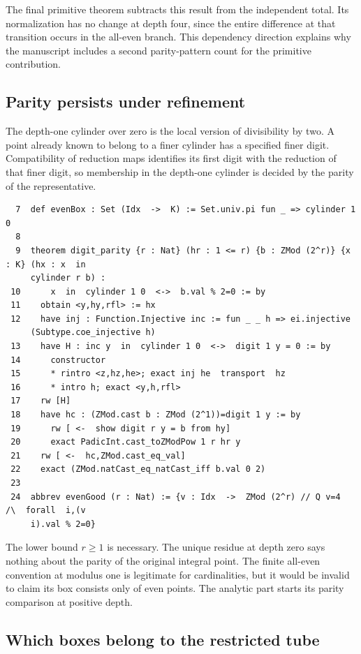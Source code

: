 \documentclass[12pt,letterpaper]{article}
\begin{document}
The final primitive theorem subtracts this result from the independent total. Its normalization has no change at depth four, since the entire difference at that transition occurs in the all-even branch. This dependency direction explains why the manuscript includes a second parity-pattern count for the primitive contribution.
\clearpage{}\subsection*{Parity persists under refinement}\label{extract-FourTubes7}
The depth-one cylinder over zero is the local version of divisibility by two. A point already known to belong to a finer cylinder has a specified finer digit. Compatibility of reduction maps identifies its first digit with the reduction of that finer digit, so membership in the depth-one cylinder is decided by the parity of the representative.
\par
{\fontsize{9.2}{11.2}\selectfont\begin{verbatim}
  7  def evenBox : Set (Idx  ->  K) := Set.univ.pi fun _ => cylinder 1 0
  8
  9  theorem digit_parity {r : Nat} (hr : 1 <= r) {b : ZMod (2^r)} {x : K} (hx : x  in
     cylinder r b) :
 10      x  in  cylinder 1 0  <->  b.val % 2=0 := by
 11    obtain <y,hy,rfl> := hx
 12    have inj : Function.Injective inc := fun _ _ h => ei.injective
     (Subtype.coe_injective h)
 13    have H : inc y  in  cylinder 1 0  <->  digit 1 y = 0 := by
 14      constructor
 15      * rintro <z,hz,he>; exact inj he  transport  hz
 16      * intro h; exact <y,h,rfl>
 17    rw [H]
 18    have hc : (ZMod.cast b : ZMod (2^1))=digit 1 y := by
 19      rw [ <-  show digit r y = b from hy]
 20      exact PadicInt.cast_toZModPow 1 r hr y
 21    rw [ <-  hc,ZMod.cast_eq_val]
 22    exact (ZMod.natCast_eq_natCast_iff b.val 0 2)
 23
 24  abbrev evenGood (r : Nat) := {v : Idx  ->  ZMod (2^r) // Q v=4  /\  forall  i,(v
     i).val % 2=0}
\end{verbatim}}
The lower bound $r\ge1$ is necessary. The unique residue at depth zero says nothing about the parity of the original integral point. The finite all-even convention at modulus one is legitimate for cardinalities, but it would be invalid to claim its box consists only of even points. The analytic part starts its parity comparison at positive depth.
\clearpage{}\subsection*{Which boxes belong to the restricted tube}\label{extract-FourTubes25}
\end{document}
